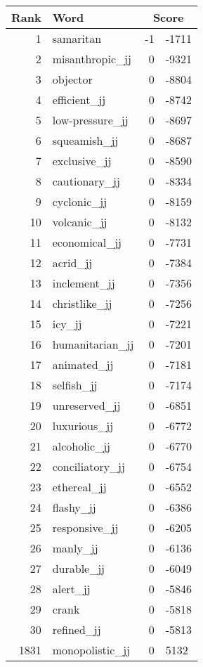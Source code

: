 \begin{longtable}[!htbp]{| rlr@{.}l |}
    \hline
    \textbf{Rank} & \textbf{Word} & \multicolumn{2}{c|}{\textbf{Score}} \\
    \hline
    \endhead
    1 & samaritan & -1 & -1711 \\
    2 & misanthropic\_jj & 0 & -9321 \\
    3 & objector & 0 & -8804 \\
    4 & efficient\_jj & 0 & -8742 \\
    5 & low-pressure\_jj & 0 & -8697 \\
    6 & squeamish\_jj & 0 & -8687 \\
    7 & exclusive\_jj & 0 & -8590 \\
    8 & cautionary\_jj & 0 & -8334 \\
    9 & cyclonic\_jj & 0 & -8159 \\
    10 & volcanic\_jj & 0 & -8132 \\
    11 & economical\_jj & 0 & -7731 \\
    12 & acrid\_jj & 0 & -7384 \\
    13 & inclement\_jj & 0 & -7356 \\
    14 & christlike\_jj & 0 & -7256 \\
    15 & icy\_jj & 0 & -7221 \\
    16 & humanitarian\_jj & 0 & -7201 \\
    17 & animated\_jj & 0 & -7181 \\
    18 & selfish\_jj & 0 & -7174 \\
    19 & unreserved\_jj & 0 & -6851 \\
    20 & luxurious\_jj & 0 & -6772 \\
    21 & alcoholic\_jj & 0 & -6770 \\
    22 & conciliatory\_jj & 0 & -6754 \\
    23 & ethereal\_jj & 0 & -6552 \\
    24 & flashy\_jj & 0 & -6386 \\
    25 & responsive\_jj & 0 & -6205 \\
    26 & manly\_jj & 0 & -6136 \\
    27 & durable\_jj & 0 & -6049 \\
    28 & alert\_jj & 0 & -5846 \\
    29 & crank & 0 & -5818 \\
    30 & refined\_jj & 0 & -5813 \\
    1831 & monopolistic\_jj & 0 & 5132 \\

\end{longtable}
